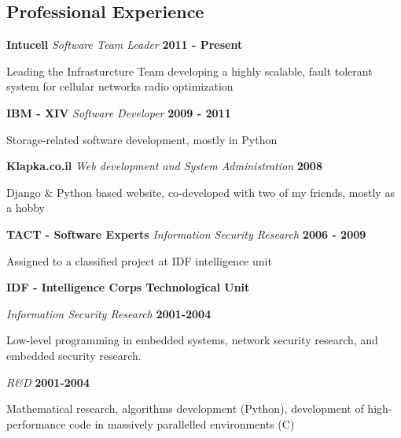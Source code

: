 \documentclass[margin,line]{res}
\newenvironment{list1}{
  \begin{list}{\ding{113}}{%
      \setlength{\itemsep}{0in}
      \setlength{\parsep}{0in} \setlength{\parskip}{0in}
      \setlength{\topsep}{0in} \setlength{\partopsep}{0in} 
      \setlength{\leftmargin}{0.2in}}}{\end{list}}
\begin{document}
\begin{resume}
\section{\sc Professional Experience}
{\bf Intucell}
{\em Software Team Leader} \hfill {\bf 2011 - Present} 
\begin{list1}
\item[] Leading the Infrasturcture Team developing a highly scalable, fault tolerant system for cellular networks radio optimization
\end{list1}

{\bf IBM - XIV}
{\em Software Developer} \hfill {\bf 2009 - 2011} 
\begin{list1}
\item[] Storage-related software development, mostly in Python
\end{list1}

{\bf Klapka.co.il}
{\em Web development and System Administration} \hfill {\bf 2008} 
\begin{list1}
\item[] Django \& Python based website, co-developed with two of my friends, mostly as a hobby
\end{list1}

{\bf TACT - Software Experts}
{\em Information Security Research} \hfill {\bf 2006 - 2009}
\begin{list1}
\item[] Assigned to a classified project at IDF intelligence unit
\end{list1}

{\bf IDF - Intelligence Corps Technological Unit}

{\em Information Security Research} \hfill {\bf 2001-2004}
\begin{list1}
\item[] Low-level programming in embedded systems, network security research, and embedded security research.
\end{list1}

{\em R\&D} \hfill {\bf 2001-2004}
\begin{list1}
\item[] Mathematical research, algorithms development (Python), development of high-performance code in massively parallelled environments (C)
\end{list1}


\end{resume}
\end{document}
